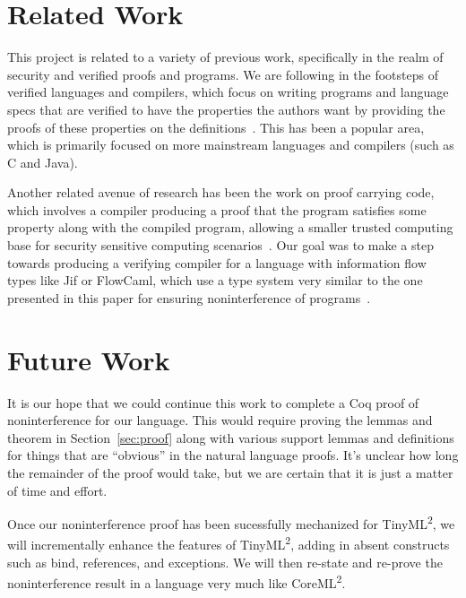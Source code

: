 \documentclass[a4paper,twocolumn]{article}
\newcommand{\langName}[0]{TinyML\textsuperscript{2}}
\newcommand{\origLang}[0]{CoreML\textsuperscript{2}}
\theoremstyle{plain}
\theoremstyle{definition}
\begin{document}
\section{Related Work}
\label{sec:related}

This project is related to a variety of previous work, specifically in the realm
of security and verified proofs and programs.  We are following in the footsteps
of verified languages and compilers, which focus on writing programs and
language specs that are verified to have the properties the authors want by
providing the proofs of these properties on the
definitions~\cite{strecker2002formal, leinenbach2005towards, dave2003compiler,
leroy2009formally, leroy2006formal, leroy2009formal, leroy2012compcert,
chlipala2010verified, berghofer2004extracting}.  This has been a popular area,
which is primarily focused on more mainstream languages and compilers (such as C
and Java).

Another related avenue of research has been the work on proof carrying code,
which involves a compiler producing a proof that the program satisfies some
property along with the compiled program, allowing a smaller trusted computing
base for security sensitive computing
scenarios~\cite{necula2002proof,necula1998design}.  Our goal was to make a step
towards producing a verifying compiler for a language with information flow
types like Jif or FlowCaml, which use a type system very similar to the one
presented in this paper for ensuring noninterference of
programs~\cite{InfoFlowML,myers1999jflow}.

\section{Future Work}
\label{sec:future}

It is our hope that we could continue this work to complete a Coq proof of
noninterference for our language.  This would require proving the lemmas and
theorem in Section~\ref{sec:proof} along with various support lemmas and
definitions for things that are ``obvious'' in the natural language proofs.
It's unclear how long the remainder of the proof would take, but we are certain
that it is just a matter of time and effort.

Once our noninterference proof has been sucessfully mechanized for \langName, we will incrementally enhance the features of \langName, adding in absent constructs such as bind, references, and exceptions.  We will then re-state and re-prove the noninterference result in a language very much like \origLang.
\end{document}
